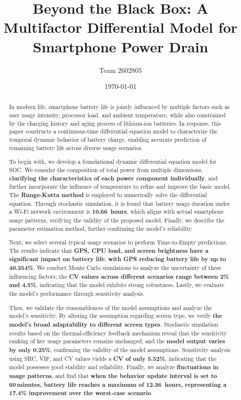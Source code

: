 \documentclass{mcmthesis}  %
\title{Beyond the Black Box: A Multifactor Differential Model for Smartphone Power Drain}  %
\author{\small Team 2602805}  %
\date{\today}  %
\begin{document}
	\begin{abstract}  %
		
		\vspace*{-12pt}
		In modern life, smartphone battery life is jointly influenced by multiple factors such as user usage intensity, processor load, and ambient temperature, while also constrained by the charging history and aging process of lithium-ion batteries. In response, this paper constructs a continuous-time differential equation model to characterize the temporal dynamic behavior of battery charge, enabling accurate prediction of remaining battery life across diverse usage scenarios.
		
		To begin with, we develop a foundational dynamic differential equation model for SOC. We consider the composition of total power from multiple dimensions, \textbf{clarifying the characteristics of each power component individually}, and further incorporate the influence of temperature to refine and improve the basic model. The \textbf{Runge-Kutta method} is employed to numerically solve the differential equation. Through stochastic simulation, it is found that battery usage duration under a Wi‑Fi network environment is \textbf{10.66  hours}, which aligns with actual smartphone usage patterns, verifying the validity of the proposed model. Finally, we describe the parameter estimation method, further confirming the model's reliability.
		
		Next, we select several typical usage scenarios to perform Time-to-Empty predictions. The results indicate that \textbf{GPS, CPU load, and screen brightness have a significant impact on battery life}, \textbf{with GPS reducing battery life by up to 40.354\%}. We conduct Monte Carlo simulations to analyze the uncertainty of these influencing factors; the \textbf{CV values across different scenarios range between 2\% and 4.5\%}, indicating that the model exhibits strong robustness. Lastly, we evaluate the model's performance through sensitivity analysis.
		
		Then, we validate the reasonableness of the model assumptions and analyze the model's sensitivity. By altering the assumption regarding screen type, we verify \textbf{the model's broad adaptability to different screen types}. Stochastic simulation results based on the thermal-efficiency feedback mechanism reveal that the sensitivity ranking of key usage parameters remains unchanged, and the \textbf{model output varies by only 0.25\%}, confirming the validity of the model assumptions. Sensitivity analysis using SRC, VIF, and CV values yields a \textbf{CV of only 5.52\%}, indicating that the model possesses good stability and reliability. Finally, we analyze \textbf{fluctuations in usage patterns}, and find that \textbf{when the behavior update interval is set to 60 minutes, battery life reaches a maximum of 12.36  hours, representing a 17.4\% improvement over the worst‑case scenario}.
		

\end{abstract}
\end{document}
